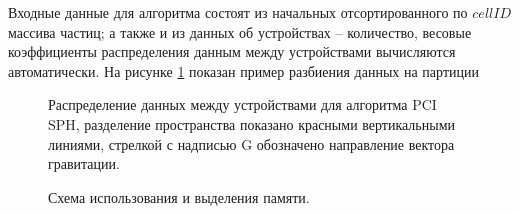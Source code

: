 Входные данные для алгоритма состоят из начальных отсортированного по  \(cellID\) массива частиц; а также и из данных об устройствах – количество, весовые коэффициенты распределения данным между устройствами вычисляются автоматически. На рисунке \ref{fig:dstr_2} показан пример разбиения данных на партиции
\begin{figure}[ht]
  \caption{Распределение данных между устройствами для алгоритма PCI SPH, разделение пространства показано красными вертикальными линиями, стрелкой с надписью G обозначено направление вектора гравитации.}
  \label{fig:dstr_2}
\end{figure}

\begin{figure}[ht]
  \caption{Схема использования и выделения памяти.}
  \label{fig:dstr_3}
\end{figure}

